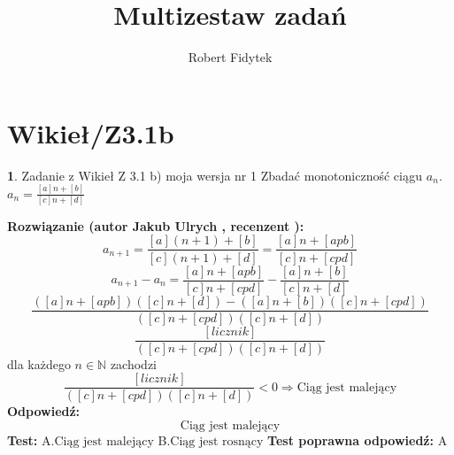 \documentclass[12pt, a4paper]{article}
\title{Multizestaw zadań}
\author{Robert Fidytek}
\date{}
\theoremstyle{definition} %
\newtheorem{zad}{}
\newcommand{\kategoria}[1]{\section{#1}} %
\newcommand{\zadStart}[1]{\begin{zad}#1\newline} %
\newcommand{\zadStop}{\end{zad}}   %
\newcommand{\rozwStart}[2]{\noindent \textbf{Rozwiązanie (autor #1 , recenzent #2): }\newline} %
\newcommand{\rozwStop}{\newline}                                            %
\newcommand{\odpStart}{\noindent \textbf{Odpowiedź:}\newline}    %
\newcommand{\odpStop}{\newline}                                             %
\newcommand{\testStart}{\noindent \textbf{Test:}\newline} %
\newcommand{\testStop}{\newline} %
\newcommand{\kluczStart}{\noindent \textbf{Test poprawna odpowiedź:}\newline} %
\newcommand{\kluczStop}{\newline} %
\begin{document}
\maketitle


\kategoria{Wikieł/Z3.1b}
\zadStart{Zadanie z Wikieł Z 3.1 b) moja wersja nr 1}
Zbadać monotoniczność ciągu $a_{n}$.\\ $a_{n}=\frac{[a]n+[b]}{[c]n+[d]}$
\zadStop
\rozwStart{Jakub Ulrych}{}
$$a_{n+1}=\frac{[a](n+1)+[b]}{[c](n+1)+[d]}=\frac{[a]n+[apb]}{[c]n+[cpd]}$$
$$a_{n+1}-a_{n}=\frac{[a]n+[apb]}{[c]n+[cpd]}-\frac{[a]n+[b]}{[c]n+[d]}$$
$$\frac{([a]n+[apb])([c]n+[d])-([a]n+[b])([c]n+[cpd])}{([c]n+[cpd])([c]n+[d])}$$
$$\frac{[licznik]}{([c]n+[cpd])([c]n+[d])}$$
dla każdego $n\in\mathbb{N}$ zachodzi
$$\frac{[licznik]}{([c]n+[cpd])([c]n+[d])}<0\Rightarrow \text{Ciąg jest malejący}$$
\rozwStop
\odpStart
$$\text{Ciąg jest malejący}$$
\odpStop
\testStart
A.$\text{Ciąg jest malejący}$
B.$\text{Ciąg jest rosnący}$
\testStop
\kluczStart
A
\kluczStop
\end{document}
